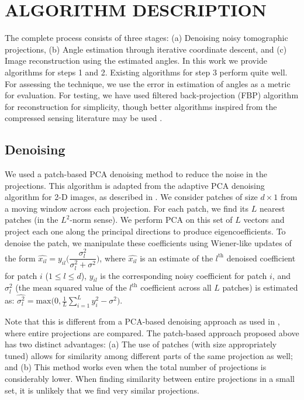 \documentclass{article}
\begin{document}
\section{ALGORITHM DESCRIPTION}
\label{sec:algo}
The complete process consists of three stages: (a) Denoising noisy tomographic projections, (b) Angle estimation through iterative coordinate descent, and (c) Image reconstruction using the estimated angles. In this work we provide algorithms for steps 1 and 2. Existing algorithms for step 3 perform quite well. For assessing the technique, we use the error in estimation of angles as a metric for evaluation. For testing, we have used filtered back-projection (FBP) algorithm for reconstruction for simplicity, though better algorithms inspired from the compressed sensing literature may be used \cite{kim2008interior}. 

\subsection{Denoising}
\label{ssec:denoising}
We used a patch-based PCA denoising method to reduce the noise in the projections. This algorithm is adapted from the adaptive PCA denoising algorithm for 2-D images, as described in \cite{Muresan03}. We consider patches of size $d \times 1$ from a moving window across each projection. For each patch, we find its $L$ nearest patches (in the $L^2$-norm sense). We perform PCA on this set of $L$ vectors and project each one along the principal directions to produce eigencoefficients. To denoise the patch, we manipulate these coefficients using Wiener-like updates of the form $\hat{x_{il}} = y_{il} \bigg(\dfrac{\sigma_l^2}{\sigma_l^2 + \sigma^2}\bigg)$, where $\hat{x_{il}}$ is an estimate of the $l^{\textrm{th}}$ denoised coefficient for patch $i$ ($1 \leq l \leq d$), $y_{il}$ is the corresponding noisy coefficient for patch $i$, and $\sigma_l^2$ (the mean squared value of the $l^{\textrm{th}}$ coefficient across all $L$ patches) is estimated as: $\hat{\sigma_l^2} = \textrm{max}\bigg(0,\frac{1}{L}\sum\limits_{i=1}^L  {y_i^2 - \sigma^2}\bigg)$. 

Note that this is different from a PCA-based denoising approach as used in \cite{singer2013}, where entire projections are compared. The patch-based approach proposed above has two distinct advantages: (a) The use of patches (with size appropriately tuned) allows for similarity among different parts of the same projection as well; and (b) This method works even when the total number of projections is considerably lower. When finding similarity between entire projections in a small set, it is unlikely that we find very similar projections.
\end{document}
